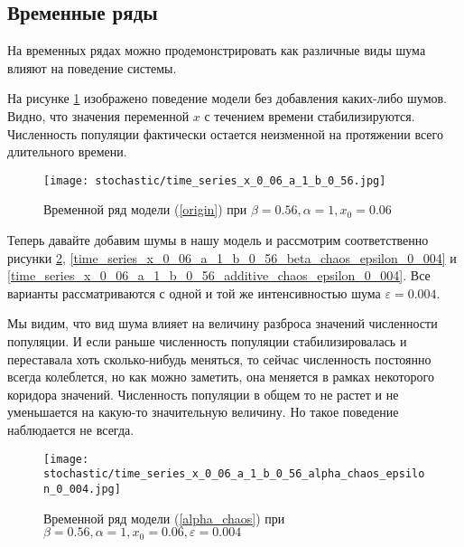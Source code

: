     \subsection{Временные ряды}

        На временных рядах можно продемонстрировать как различные виды шума влияют на поведение системы.

        На рисунке \ref{time_series_x_0_06_a_1_b_0_56} изображено поведение модели без добавления каких-либо шумов. Видно, что значения переменной \(x\) с течением времени стабилизируются. Численность популяции фактически остается неизменной на протяжении всего длительного времени.

        \begin{figure}
            \centering
            \texttt{[image: stochastic/time\_series\_x\_0\_06\_a\_1\_b\_0\_56.jpg]}

            \captionsetup{justification=centering}
            \caption{Временной ряд модели (\ref{origin}) при \(\beta = 0.56, \alpha = 1, x_0 = 0.06\)}
            \label{time_series_x_0_06_a_1_b_0_56}
        \end{figure}

        Теперь давайте добавим шумы в нашу модель и рассмотрим соответственно рисунки \ref{time_series_x_0_06_a_1_b_0_56_alpha_chaos_epsilon_0_004}, \ref{time_series_x_0_06_a_1_b_0_56_beta_chaos_epsilon_0_004} и \ref{time_series_x_0_06_a_1_b_0_56_additive_chaos_epsilon_0_004}. Все варианты рассматриваются с одной и той же интенсивностью шума \(\varepsilon = 0.004\). 
        
        Мы видим, что вид шума влияет на величину разброса значений численности популяции.  И если раньше численность популяции стабилизировалась и переставала хоть сколько-нибудь меняться, то сейчас численность постоянно всегда колеблется, но как можно заметить, она меняется в рамках некоторого коридора значений. Численность популяции в общем то не растет и не уменьшается на какую-то значительную величину. Но такое поведение наблюдается не всегда.




        \begin{figure}
            \centering
            \texttt{[image: stochastic/time\_series\_x\_0\_06\_a\_1\_b\_0\_56\_alpha\_chaos\_epsilon\_0\_004.jpg]}
        
            \captionsetup{justification=centering}
            \caption{Временной ряд модели (\ref{alpha_chaos}) при \(\beta = 0.56, \alpha = 1, x_0 = 0.06, \varepsilon = 0.004\)}
            \label{time_series_x_0_06_a_1_b_0_56_alpha_chaos_epsilon_0_004}
        \end{figure}

